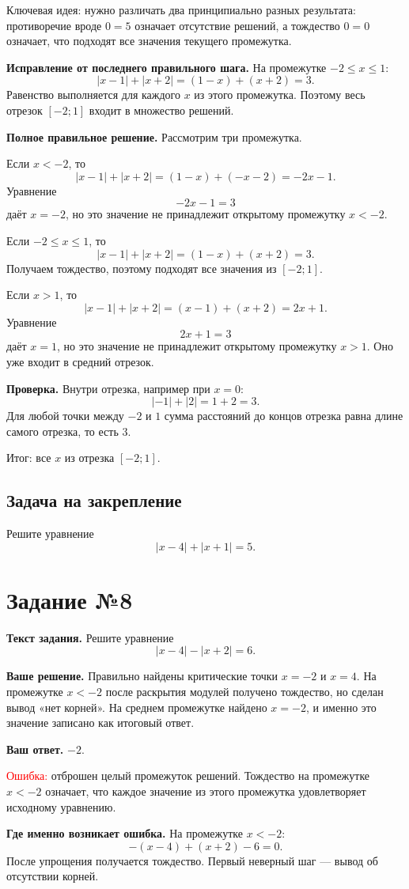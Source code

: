\documentclass[12pt,a4paper]{article}
\newcommand{\err}{\textcolor{red}{Ошибка:}}
\newcommand{\idea}{\textcolor{blue!60!black}{Ключевая идея:}}
\newcommand{\result}{\textcolor{teal!60!black}{Итог:}}
\newcommand{\tasktitle}[1]{\phantomsection\label{task:#1}\section*{Задание №#1}}
\begin{document}
\idea{} нужно различать два принципиально разных результата: противоречие вроде $0=5$ означает отсутствие решений, а тождество $0=0$ означает, что подходят все значения текущего промежутка.

\textbf{Исправление от последнего правильного шага.} На промежутке $-2\le x\le1$:
\[
|x-1|+|x+2|=(1-x)+(x+2)=3.
\]
Равенство выполняется для каждого $x$ из этого промежутка. Поэтому весь отрезок $[-2;1]$ входит в множество решений.

\textbf{Полное правильное решение.} Рассмотрим три промежутка.

Если $x<-2$, то
\[
|x-1|+|x+2|=(1-x)+(-x-2)=-2x-1.
\]
Уравнение
\[
-2x-1=3
\]
даёт $x=-2$, но это значение не принадлежит открытому промежутку $x<-2$.

Если $-2\le x\le1$, то
\[
|x-1|+|x+2|=(1-x)+(x+2)=3.
\]
Получаем тождество, поэтому подходят все значения из $[-2;1]$.

Если $x>1$, то
\[
|x-1|+|x+2|=(x-1)+(x+2)=2x+1.
\]
Уравнение
\[
2x+1=3
\]
даёт $x=1$, но это значение не принадлежит открытому промежутку $x>1$. Оно уже входит в средний отрезок.

\textbf{Проверка.} Внутри отрезка, например при $x=0$:
\[
|-1|+|2|=1+2=3.
\]
Для любой точки между $-2$ и $1$ сумма расстояний до концов отрезка равна длине самого отрезка, то есть $3$.

\result{} все $x$ из отрезка $[-2;1]$.

\subsection*{Задача на закрепление}
Решите уравнение
\[
|x-4|+|x+1|=5.
\]

\newpage
\tasktitle{8}
\textbf{Текст задания.} Решите уравнение
\[
|x-4|-|x+2|=6.
\]

\textbf{Ваше решение.} Правильно найдены критические точки $x=-2$ и $x=4$. На промежутке $x<-2$ после раскрытия модулей получено тождество, но сделан вывод «нет корней». На среднем промежутке найдено $x=-2$, и именно это значение записано как итоговый ответ.

\textbf{Ваш ответ.} $-2$.

\err{} отброшен целый промежуток решений. Тождество на промежутке $x<-2$ означает, что каждое значение из этого промежутка удовлетворяет исходному уравнению.

\textbf{Где именно возникает ошибка.} На промежутке $x<-2$:
\[
-(x-4)+ (x+2)-6=0.
\]
После упрощения получается тождество. Первый неверный шаг --- вывод об отсутствии корней.
\end{document}
